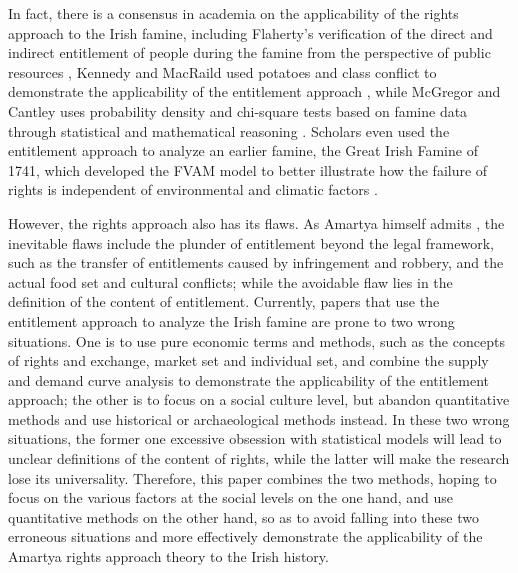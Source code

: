 In fact, there is a consensus in academia on the applicability of the rights approach to the Irish famine, including Flaherty's verification of the direct and indirect entitlement of  people during the famine from the perspective of public resources \citep{flaherty2021common}, Kennedy and MacRaild used potatoes and class conflict to demonstrate the applicability of the entitlement approach \citep{kennedy2022perspectives}, while McGregor and Cantley uses probability density and chi-square tests based on famine data through statistical and mathematical reasoning \citep{mcgregor1992test}. Scholars even used the entitlement approach to analyze an earlier famine, the Great Irish Famine of 1741, which developed the FVAM model to better illustrate how the failure of rights is independent of environmental and climatic factors \citep{engler2013irish}.

However, the rights approach also has its flaws. As Amartya himself admits \citep{sen1982poverty}, the inevitable flaws include the plunder of entitlement beyond the legal framework, such as the transfer of entitlements caused by infringement and robbery, and the actual food set and cultural conflicts; while the avoidable flaw lies in the definition of the content of entitlement. Currently, papers that use the entitlement approach to analyze the Irish famine are prone to two wrong situations. One is to use pure economic terms and methods, such as the concepts of rights and exchange, market set and individual set, and combine the supply and demand curve analysis to demonstrate the applicability of the entitlement approach; the other is to focus on a social culture level, but abandon quantitative methods and use historical or archaeological methods instead. In these two wrong situations, the former one excessive obsession with statistical models will lead to unclear definitions of the content of rights, while the latter will make the research lose its universality. Therefore, this paper combines the two methods, hoping to focus on the various factors at the social levels on the one hand, and use quantitative methods on the other hand, so as to avoid falling into these two erroneous situations and more effectively demonstrate the applicability of the Amartya rights approach theory to the Irish history.

